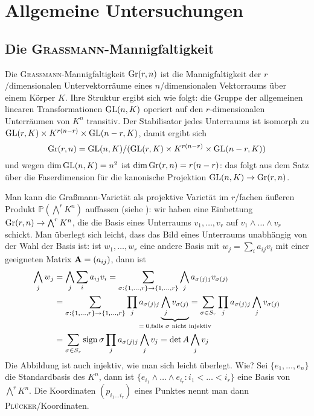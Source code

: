 \chapter{Allgemeine Untersuchungen} \label{chap:general}
\section{Die \textsc{Graßmann}-Mannigfaltigkeit} \label{sec:grassmann}
Die \textsc{Graßmann}-Mannigfaltigkeit $\grass r/n$ ist die Mannigfaltigkeit der $r$\-/dimensionalen Untervektorräume eines $n$\-/dimensionalen Vektorraums über einem Körper $K$. Ihre Struktur ergibt sich wie folgt: die Gruppe der allgemeinen linearen Transformationen $\mathrm{GL}(n,K)$ operiert auf den $r$-dimensionalen Unterräumen von $K^n$ transitiv. Der Stabilisator jedes Unterraums ist isomorph zu $\mathrm{GL}(r,K) \times K^{r(n-r)} \times \mathrm{GL}(n-r,K)$, damit ergibt sich
\begin{equation}
\grass r/n = \GL nK / (\GL rK \times K^{r(n-r)} \times \GL{n-r}K)
\end{equation}
und wegen $\dim \mathrm{GL}(n,K) = n^2$ ist $\dim \grass r/n = r(n-r)$: das folgt aus dem Satz über die Faserdimension für die kanonische Projektion $\GL nK \to \grass r/n$.

Man kann die Graßmann-Varietät als projektive Varietät im $r$\-/fachen äußeren Produkt $\mathbb P(\bigwedge^r K^n)$ auffassen (siehe \cite[S.~42]{Shafarevich}): wir haben eine Einbettung $\grass r/n \to \bigwedge^r K^n$, die die Basis eines Unterraums $v_1, \dots, v_r$ auf $v_1 \wedge
\dots \wedge v_r$ schickt. Man überlegt sich leicht, dass das Bild eines Unterraums unabhängig von der Wahl der Basis ist: ist $w_1, \dots, w_r$ eine andere Basis mit $w_j = \sum_i a_{ij} v_i$ mit einer geeigneten Matrix $\mathbf{A} = (a_{ij})$, dann ist
\begin{align*}
\bigwedge_j w_j &= \bigwedge_j \sum_i a_{ij} v_i = \sum_{\sigma: \{1,\dots,r\} \rightarrow \{1,\dots,r\}} \bigwedge_j a_{\sigma(j)j} v_{\sigma(j)} \\
	&= \sum_{\sigma: \{1,\dots,r\} \rightarrow \{1,\dots,r\}} \prod_j a_{\sigma(j)j} \wunderbrace{\bigwedge_j v_{\sigma(j)}}_{$= 0$,falls $\sigma$ nicht injektiv} = \sum_{\sigma \in S_r} \prod_j a_{\sigma(j)j} \bigwedge_j v_{\sigma(j)} \\
	&= \sum_{\sigma \in S_r} \sign \sigma \prod_j a_{\sigma(j)j} \bigwedge_j v_j = \det A \bigwedge_j v_j
\end{align*}
Die Abbildung ist auch injektiv, wie man sich leicht überlegt. \note Wie?
Sei $\{e_1, \dots, e_n\}$ die Standardbasis des $K^n$, dann ist $\{e_{i_1} \wedge \dots \wedge e_{i_r} \colon i_1 < \dots < i_r\}$ eine Basis von $\bigwedge^r K^n$. Die Koordinaten $(p_{i_1 \dots i_r})$ eines Punktes nennt man dann \textsc{Plücker}\-/Koordinaten.

